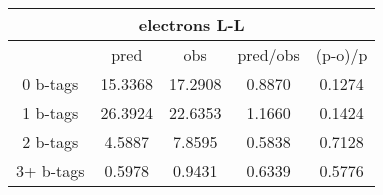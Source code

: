 \begin{table}
\begin{tabular}{c|cccc}\multicolumn{5}{c}{electrons L-L} \\ \hline
 &pred&obs&pred/obs&(p-o)/p\\
\hline
0 b-tags & 15.3368 & 17.2908 & 0.8870 & 0.1274\\
1 b-tags & 26.3924 & 22.6353 & 1.1660 & 0.1424\\
2 b-tags & 4.5887 & 7.8595 & 0.5838 & 0.7128\\
3+ b-tags & 0.5978 & 0.9431 & 0.6339 & 0.5776\\
\hline
\end{tabular}
\end{table}
